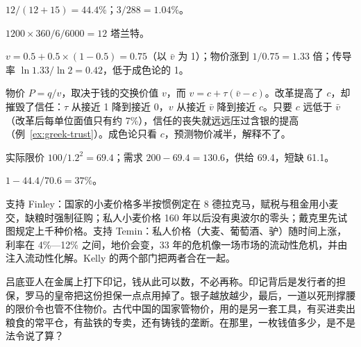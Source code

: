 \begin{answers}
\item $12/(12+15)=44.4\%$；$3/288=1.04\%$。
\item $1200\times360/6/6000=12$ 塔兰特。
\item $v=0.5+0.5\times(1-0.5)=0.75$（以 $\bar v$ 为 1）；物价涨到 $1/0.75=1.33$ 倍；传导率 $\ln1.33/\ln2=0.42$，低于成色论的 1。
\item 物价 $P=q/v$，取决于钱的交换价值 $v$，而 $v=c+\tau(\bar v-c)$。改革提高了 $c$，却摧毁了信任：$\tau$ 从接近 1 降到接近 0，$v$ 从接近 $\bar v$ 降到接近 $c$。只要 $c$ 远低于 $\bar v$（改革后每单位面值只有约 7\%），信任的丧失就远远压过含银的提高（例~\ref{ex:greek-trust}）。成色论只看 $c$，预测物价减半，解释不了。
\item 实际限价 $100/1.2^{2}=69.4$；需求 $200-69.4=130.6$，供给 69.4，短缺 61.1。
\item $1-44.4/70.6=37\%$。
\item 支持 Finley：国家的小麦价格多半按惯例定在 8 德拉克马，赋税与租金用小麦交，缺粮时强制征购；私人小麦价格 160 年以后没有奥波尔的零头；戴克里先试图规定上千种价格。支持 Temin：私人价格（大麦、葡萄酒、驴）随时间上涨，利率在 4\%—12\% 之间，地价会变，33 年的危机像一场市场的流动性危机，并由注入流动性化解。Kelly 的两个部门把两者合在一起。
\end{answers}

吕底亚人在金属上打下印记，钱从此可以数，不必再称。印记背后是发行者的担保，罗马的皇帝把这份担保一点点用掉了。银子越放越少，最后，一道以死刑撑腰的限价令也管不住物价。古代中国的国家管物价，用的是另一套工具，有买进卖出粮食的常平仓，有盐铁的专卖，还有铸钱的垄断。在那里，一枚钱值多少，是不是法令说了算？
